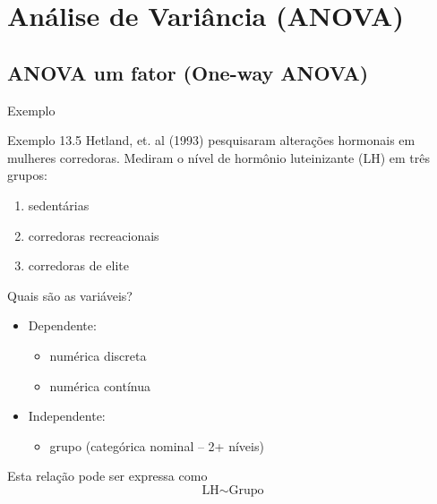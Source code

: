\documentclass{beamer}
\begin{document}

\section[ANOVA]{Análise de Variância (ANOVA)}

\subsection{ANOVA um fator (One-way ANOVA)}

\begin{frame}[label=exemplo13.5]{Exemplo}
  \begin{exampleblock}{Exemplo 13.5}
    Hetland, et. al (1993) pesquisaram alterações hormonais em mulheres corredoras.
    Mediram o nível de hormônio luteinizante (LH) em três grupos:
    \begin{enumerate}
    \item sedentárias
    \item corredoras recreacionais
    \item corredoras de elite
    \end{enumerate}
  \end{exampleblock}
\end{frame}

\begin{frame}{Quais são as variáveis?}
  \begin{itemize}
    \small
  \item Dependente:
    \begin{itemize}
      \footnotesize
    \item numérica discreta
    \item numérica contínua
    \end{itemize}
  \item Independente:
    \begin{itemize}
      \footnotesize
    \item grupo (categórica nominal -- 2+ níveis)
    \end{itemize}
  \end{itemize}
  \vfill
  \begin{block}{Esta relação pode ser expressa como}
    \begin{displaymath}
      \text{LH} \sim \text{Grupo}
    \end{displaymath}
  \end{block}
\end{frame}
\end{document}
